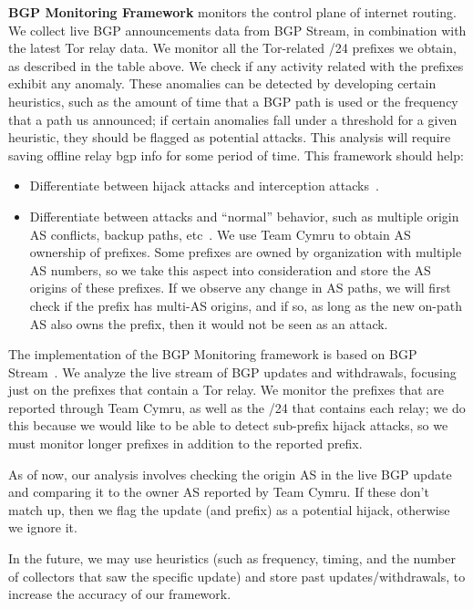 {\bf BGP Monitoring Framework} monitors the control plane of internet routing. We collect live BGP announcements data from BGP Stream, in combination with the latest Tor relay data. We monitor all the Tor-related /24 prefixes we obtain, as described in the table above. We check if any activity related with the prefixes exhibit any anomaly. These anomalies can be detected by developing certain heuristics, such as the amount of time that a BGP path is used or the frequency that a path us announced; if certain anomalies fall under a threshold for a given heuristic, they should be flagged as potential attacks. This analysis will require saving offline relay bgp info for some period of time.  This framework should help:
\begin{itemize}
\item Differentiate between hijack attacks and interception attacks~\cite{ballani2007study}.
\item Differentiate between attacks and ``normal'' behavior, such as multiple origin AS conflicts, backup paths, etc~\cite{zhao2001analysis}.
We use Team Cymru to obtain AS ownership of prefixes. Some prefixes are owned by organization with multiple AS numbers, so we take this aspect into consideration and store the AS origins of these prefixes. If we observe any change in AS paths, we will first check if the prefix has multi-AS origins, and if so, as long as the new on-path AS also owns the prefix, then it would not be seen as an attack. 
\end{itemize}

The implementation of the BGP Monitoring framework is based on BGP Stream~\cite{bgpstream}.  We analyze the live stream of BGP updates and withdrawals, focusing just on the prefixes that contain a Tor relay.  We monitor the prefixes that are reported through Team Cymru, as well as the /24 that contains each relay; we do this because we would like to be able to detect sub-prefix hijack attacks, so we must monitor longer prefixes in addition to the reported prefix.  

As of now, our analysis involves checking the origin AS in the live BGP update and comparing it to the owner AS reported by Team Cymru.  If these don't match up, then we flag the update (and prefix) as a potential hijack, otherwise we ignore it.  

In the future, we may use heuristics (such as frequency, timing, and the number of collectors that saw the specific update) and store past updates/withdrawals, to increase the accuracy of our framework.

